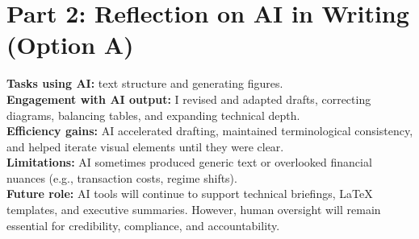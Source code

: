 \documentclass[10pt, a4paper]{article}
\begin{document}
\newpage
\section*{Part 2: Reflection on AI in Writing (Option A)}
\textbf{Tasks using AI:} text structure and generating figures. \\
\textbf{Engagement with AI output:} I revised and adapted drafts, correcting diagrams, balancing tables, and expanding technical depth. \\
\textbf{Efficiency gains:} AI accelerated drafting, maintained terminological consistency, and helped iterate visual elements until they were clear. \\
\textbf{Limitations:} AI sometimes produced generic text or overlooked financial nuances (e.g., transaction costs, regime shifts). \\
\textbf{Future role:} AI tools will continue to support technical briefings, LaTeX templates, and executive summaries. However, human oversight will remain essential for credibility, compliance, and accountability.
\end{document}
